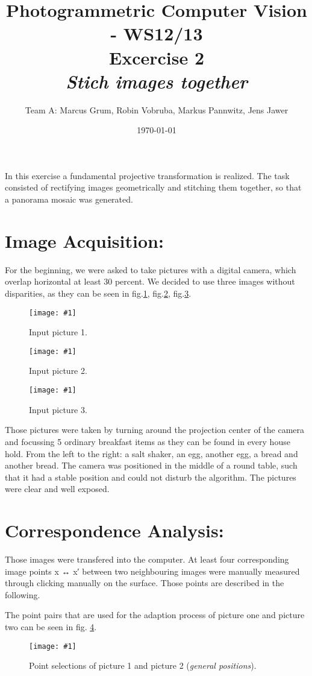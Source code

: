 \documentclass[a4paper,headings=small]{scrartcl}
\title{Photogrammetric Computer Vision - WS12/13 \\ Excercise 2 \\ \emph{Stich images together}}
\author{Team A: Marcus Grum, Robin Vobruba, Markus Pannwitz, Jens Jawer}
\date{\today}
\numberwithin{equation}{section} %
\numberwithin{figure}{section}   %
\newcommand{\image}[3]{
	\begin{figure}[htbp]
		\centering
		\texttt{[image: \#1]}
		\caption{#3}
		\label{fig:#1}
	\end{figure}
}
\begin{document}
\maketitle

In this exercise a fundamental projective transformation is realized. 
The task consisted of rectifying images geometrically and stitching
them together, so that a panorama mosaic was generated.


\section{Image Acquisition:}

For the beginning, we were asked to take pictures with a digital camera,
which overlap horizontal at least 30 percent. 
We decided to use three images without disparities, 
as they can be seen in fig.\ref{fig:../../../target/InputPics/1},
fig.\ref{fig:../../../target/InputPics/2}, fig.\ref{fig:../../../target/InputPics/3}.

\image{../../../target/InputPics/1}{0.3}{%
		Input picture 1.}
\image{../../../target/InputPics/2}{0.3}{%
		Input picture 2.}
\image{../../../target/InputPics/3}{0.3}{%
		Input picture 3.}

Those pictures were taken by turning around the projection center of the camera
and focussing 5 ordinary breakfast items as they can be found in every house hold.
From the left to the right: a salt shaker, an egg, another egg, a bread and another bread.
The camera was positioned in the middle of a round table, such that it had a stable position
and could not disturb the algorithm. The pictures were clear and well exposed. 

\section{Correspondence Analysis:}

Those images were transfered into the computer. At least four corresponding image points 
x ↔ x′ between two neighbouring images were manually measured through clicking manually on the surface. 
Those points are described in the following.

The point pairs that are used for the adaption process of picture one and picture two
can be seen in fig. \ref{fig:../../../target/general_selection_1}.

\image{../../../target/general_selection_1}{0.6}{%
		Point selections of picture 1 and picture 2 (\emph{general positions}).}
\end{document}
